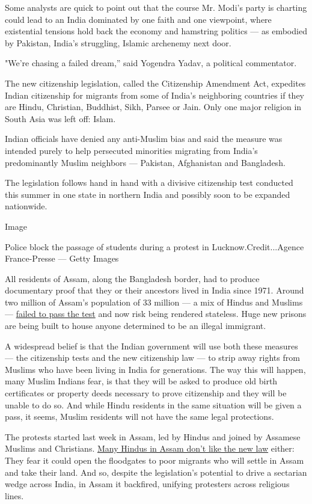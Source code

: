 Some analysts are quick to point out that the course Mr. Modi's party is
charting could lead to an India dominated by one faith and one
viewpoint, where existential tensions hold back the economy and
hamstring politics --- as embodied by Pakistan, India's struggling,
Islamic archenemy next door.

"We're chasing a failed dream,'' said Yogendra Yadav, a political
commentator.

The new citizenship legislation, called the Citizenship Amendment Act,
expedites Indian citizenship for migrants from some of India's
neighboring countries if they are Hindu, Christian, Buddhist, Sikh,
Parsee or Jain. Only one major religion in South Asia was left off:
Islam.

Indian officials have denied any anti-Muslim bias and said the measure
was intended purely to help persecuted minorities migrating from India's
predominantly Muslim neighbors --- Pakistan, Afghanistan and Bangladesh.

The legislation follows hand in hand with a divisive citizenship test
conducted this summer in one state in northern India and possibly soon
to be expanded nationwide.

Image

Police block the passage of students during a protest in
Lucknow.Credit...Agence France-Presse --- Getty Images

All residents of Assam, along the Bangladesh border, had to produce
documentary proof that they or their ancestors lived in India since
1971. Around two million of Assam's population of 33 million --- a mix
of Hindus and Muslims ---
\href{https://www.nytimes.com/2019/08/31/world/asia/india-muslim-citizen-list.html}{failed
to pass the test} and now risk being rendered stateless. Huge new
prisons are being built to house anyone determined to be an illegal
immigrant.

A widespread belief is that the Indian government will use both these
measures --- the citizenship tests and the new citizenship law --- to
strip away rights from Muslims who have been living in India for
generations. The way this will happen, many Muslim Indians fear, is that
they will be asked to produce old birth certificates or property deeds
necessary to prove citizenship and they will be unable to do so. And
while Hindu residents in the same situation will be given a pass, it
seems, Muslim residents will not have the same legal protections.

The protests started last week in Assam, led by Hindus and joined by
Assamese Muslims and Christians.
\href{https://www.nytimes.com/2019/12/12/world/asia/india-protests-citizenship-bill.html}{Many
Hindus in Assam don't like the new law} either: They fear it could open
the floodgates to poor migrants who will settle in Assam and take their
land. And so, despite the legislation's potential to drive a sectarian
wedge across India, in Assam it backfired, unifying protesters across
religious lines.

